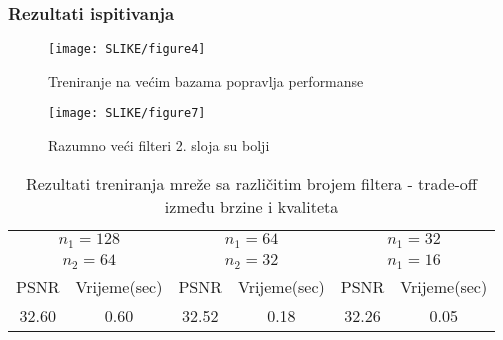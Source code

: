 \documentclass{beamer}
\begin{document}
 \begin{frame}
\frametitle{Rezultati ispitivanja}

 \begin{figure}[ht]
        \begin{minipage}[b]{0.45\linewidth}
            \centering
            \texttt{[image: SLIKE/figure4]}
            \caption{Treniranje na većim bazama popravlja performanse}
            \label{fig:a}
        \end{minipage}
        \hspace{0.5cm}
        \begin{minipage}[b]{0.45\linewidth}
            \centering
            \texttt{[image: SLIKE/figure7]}
            \caption{Razumno veći filteri 2. sloja su bolji}
            \label{fig:b}
        \end{minipage}
    \end{figure}

\begin{table}[h!]
\centering
\begin{tabular}{ |c|c|c|c|c|c| } 
\hline
\multicolumn{2}{|c|}{$n_1=128$} & \multicolumn{2}{|c|}{$n_1=64$} & \multicolumn{2}{|c|}{$n_1=32$} \\
\multicolumn{2}{|c|}{$n_2=64$} & \multicolumn{2}{|c|}{$n_2=32$} & \multicolumn{2}{|c|}{$n_1=16$} \\
\hline
PSNR & Vrijeme(sec) & PSNR & Vrijeme(sec) & PSNR & Vrijeme(sec) \\
\hline
32.60 & 0.60 & 32.52 & 0.18 & 32.26 & 0.05 \\
\hline
\end{tabular}
\caption{Rezultati treniranja mreže sa različitim brojem filtera - trade-off između brzine i kvaliteta}
\label{table:1}
\end{table}


\end{frame}
\end{document}
